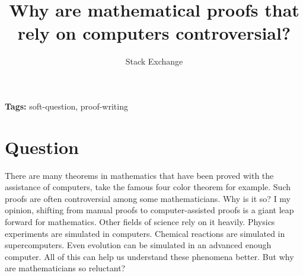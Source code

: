 \documentclass{article}
\title{Why are mathematical proofs that rely on computers controversial?}
\author{Stack Exchange}
\date{}
\begin{document}
\maketitle

\noindent\textbf{Tags:} soft-question, proof-writing

\section*{Question}
There are many theorems in mathematics that have been proved with the assistance of computers, take the famous four color theorem for example. Such proofs are often controversial among some mathematicians. Why is it so? I my opinion, shifting from manual proofs to computer-assisted proofs is a giant leap forward for mathematics. Other fields of science rely on it heavily. Physics experiments are simulated in computers. Chemical reactions are simulated in supercomputers. Even evolution can be simulated in an advanced enough computer. All of this can help us understand these phenomena better. But why are mathematicians so reluctant?
\end{document}

